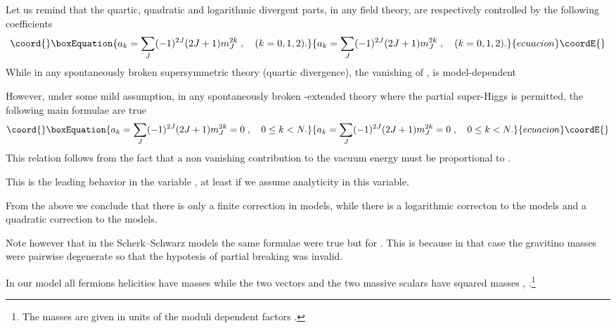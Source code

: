 \documentclass[a4paper,12pt]{article}
\begin{document}
Let us remind that the quartic, quadratic and logarithmic divergent parts, in any field theory, are respectively controlled
by the following coefficients \cite{zum,dewitt}
\begin{equation}\coord{}\boxEquation{
a_k = \sum_J (-1)^{2J}(2J+1)m_J^{2k} \; ,\quad (k=0,1,2).
}{
a_k = \sum_J (-1)^{2J}(2J+1)m_J^{2k} \; ,\quad (k=0,1,2).
}{ecuacion}\coordE{}\end{equation}
While \coordHE{} in any spontaneously broken supersymmetric theory (quartic divergence), the vanishing of \coordHE{}, \coordHE{} is 
model-dependent \cite{zum}

However, under some mild assumption, in any spontaneously broken \coordHE{}-extended theory where the partial super-Higgs \coordHE{}
is permitted, the following main formulae are true
\begin{equation}\coord{}\boxEquation{
a_k = \sum_J (-1)^{2J}(2J+1)m_J^{2k} =0 \; ,\quad 0\leq k<N.
}{
a_k = \sum_J (-1)^{2J}(2J+1)m_J^{2k} =0 \; ,\quad 0\leq k<N.
}{ecuacion}\coordE{}\end{equation}
This relation follows from the fact that a non vanishing contribution to the vacuum energy
 must be proportional to \coordHE{}.

This is the leading behavior in the variable \coordHE{}, at least if we assume analyticity in this variable.

From  the above we conclude that there is only a finite correction in \coordHE{} models, while there is a logarithmic correcton to the 
\coordHE{} models and a quadratic correction to the \coordHE{} models.

Note however that in the Scherk--Schwarz \coordHE{} models \cite{ss} the same formulae were true but for \coordHE{}.
This is because in that case the gravitino masses were pairwise degenerate so that the hypotesis of partial breaking \coordHE{} was
invalid.


In our model all fermions helicities have masses \coordHE{} while the two vectors and the two massive scalars have squared 
masses \coordHE{}, \coordHE{}.\footnote{The masses are given in units of the moduli dependent factors
\coordHE{}.}
\end{document}
